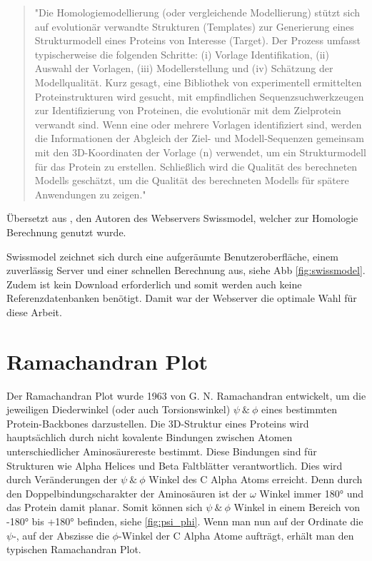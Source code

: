 \begin{quote}
    "Die Homologiemodellierung (oder vergleichende Modellierung) stützt sich auf evolutionär verwandte Strukturen (Templates) zur Generierung eines Strukturmodell eines Proteins von Interesse (Target). Der Prozess umfasst typischerweise die folgenden Schritte: (i) Vorlage Identifikation, (ii) Auswahl der Vorlagen, (iii) Modellerstellung und (iv) Schätzung der Modellqualität. Kurz gesagt, eine Bibliothek von experimentell ermittelten Proteinstrukturen wird gesucht, mit empfindlichen Sequenzsuchwerkzeugen zur Identifizierung von Proteinen, die evolutionär mit dem Zielprotein verwandt sind. Wenn eine oder mehrere Vorlagen identifiziert sind, werden die Informationen der Abgleich der Ziel- und Modell-Sequenzen gemeinsam mit den 3D-Koordinaten der Vorlage (n) verwendet, um ein Strukturmodell für das Protein zu erstellen. Schließlich wird die Qualität des berechneten Modells geschätzt, um die Qualität des berechneten Modells für spätere Anwendungen zu zeigen."
\end{quote}

Übersetzt aus \cite{Biasini.2014}, den Autoren des Webservers Swissmodel, welcher zur Homologie Berechnung genutzt wurde. 

Swissmodel zeichnet sich durch eine aufgeräumte Benutzeroberfläche, einem zuverlässig Server und einer schnellen Berechnung aus, siehe \ac{Abb} \ref{fig:swissmodel}. Zudem ist kein Download erforderlich und somit werden auch keine Referenzdatenbanken benötigt. Damit war der Webserver die optimale Wahl für diese Arbeit.



\section{Ramachandran Plot}
\label{sec:ramachandran}
Der Ramachandran Plot wurde 1963 von G. N. Ramachandran \cite{RAMACHANDRAN.1963} entwickelt, um die jeweiligen Diederwinkel (oder auch Torsionswinkel)  $\psi\ \&\ \phi$ eines bestimmten Protein-Backbones darzustellen. Die 3D-Struktur eines Proteins wird hauptsächlich durch nicht kovalente Bindungen zwischen Atomen unterschiedlicher Aminosäurereste bestimmt. Diese Bindungen sind für Strukturen wie Alpha Helices und Beta Faltblätter verantwortlich. Dies wird durch Veränderungen der  $\psi\ \&\ \phi$ Winkel des C Alpha Atoms erreicht. Denn durch den Doppelbindungscharakter der Aminosäuren ist der $\omega$ Winkel immer 180° und das Protein damit planar. Somit können sich $\psi\ \&\ \phi$ Winkel in einem Bereich von -180° bis +180° befinden, siehe \ref{fig:psi_phi}. Wenn man nun auf der Ordinate die $\psi$-, auf der Abszisse die $\phi$-Winkel der C Alpha Atome aufträgt, erhält man den typischen Ramachandran Plot. 

